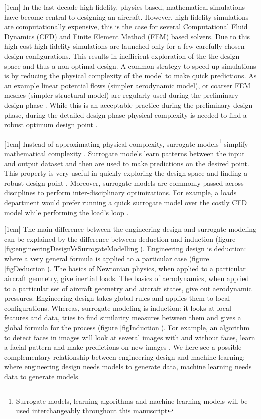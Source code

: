 [1cm]
In the last decade high-fidelity, physics based, mathematical simulations have become central to designing an aircraft. However, high-fidelity simulations are computationally expensive, this is the case for several Computational Fluid Dynamics (CFD) and Finite Element Method (FEM) based solvers. Due to this high cost high-fidelity simulations are launched only for a few carefully chosen design configurations. This results in inefficient exploration of the the design space and thus a non-optimal design. A common strategy to speed up simulations is by reducing the physical complexity of the model to make quick predictions. As an example linear potential flows (simpler aerodynamic model), or coarser FEM meshes (simpler structural model) are regularly used during the preliminary design phase \cite{cummings2015applied}. While this is an acceptable practice during the preliminary design phase, during the detailed design phase physical complexity is needed to find a robust optimum design point \cite{raymer2012aircraft}.

[1cm]
Instead of approximating physical complexity, surrogate models\footnote{Surrogate models, learning algorithms and machine learning models will be used interchangeably throughout this manuscript} simplify mathematical complexity \cite{verveld2016reduced}. Surrogate models learn patterns between the input and output dataset and then are used to make predictions on the desired point. This property is very useful in quickly exploring the design space and finding a robust design point \cite{forrester2008engineering}. Moreover, surrogate models are commonly passed across disciplines to perform inter-disciplinary optimizations. For example, a loads department would prefer running a quick surrogate model over the costly CFD model while performing the load's loop \cite{bartoliAIAA2017, bartoliAGILE2017}.  

[1cm]
The main difference between the engineering design and surrogate modeling can be explained by the difference between deduction and induction \cite{domingos2012few} (figure \ref{fig:engineeringDesignVsSurrogateModelling}). Engineering design is deduction: where a very general formula is applied to a particular case (figure \ref{figDeduction}). The basics of Newtonian physics, when applied to a particular aircraft geometry, give inertial loads. The basics of aerodynamics, when applied to a particular set of aircraft geometry and aircraft states, give out aerodynamic pressures. Engineering design takes global rules and applies them to local configurations. Whereas, surrogate modeling is induction: it looks at local features and data, tries to find similarity measures between them and gives a global formula for the process (figure \ref{figInduction}). For example, an algorithm to detect faces in images will look at several images with and without faces, learn a facial pattern and make predictions on new images \cite{marszalek2007semantic}. We here see a possible complementary relationship between engineering design and machine learning; where engineering design needs models to generate data, machine learning needs data to generate models.

